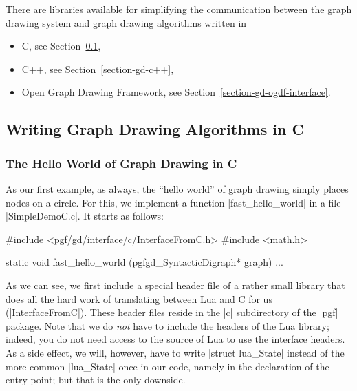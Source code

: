 There are libraries available for simplifying the communication between the
graph drawing system and graph drawing algorithms written in
%
\begin{itemize}
    \item C, see Section~\ref{section-gd-c},
    \item C++, see Section~\ref{section-gd-c++},
    \item Open Graph Drawing Framework, see
        Section~\ref{section-gd-ogdf-interface}.
\end{itemize}


\subsection{Writing Graph Drawing Algorithms in C}
\label{section-gd-c}

\subsubsection{The Hello World of Graph Drawing in C}

As our first example, as always, the ``hello world'' of graph drawing simply
places nodes on a circle. For this, we implement a function |fast_hello_world|
in a file |SimpleDemoC.c|. It starts as follows:
%
\begin{codeexample}[code only, tikz syntax=false]
#include <pgf/gd/interface/c/InterfaceFromC.h>
#include <math.h>

static void fast_hello_world (pgfgd_SyntacticDigraph* graph) {
  ...
}
\end{codeexample}

As we can see, we first include a special header file of a rather small library
that does all the hard work of translating between Lua and C for us
(|InterfaceFromC|). These header files reside in the |c| subdirectory of the
|pgf| package. Note that we do \emph{not} have to include the headers of the
Lua library; indeed, you do not need access to the source of Lua to use the
interface headers. As a side effect, we will, however, have to write
|struct lua_State| instead of the more common |lua_State| once in our code,
namely in the declaration of the entry point; but that is the only downside.

